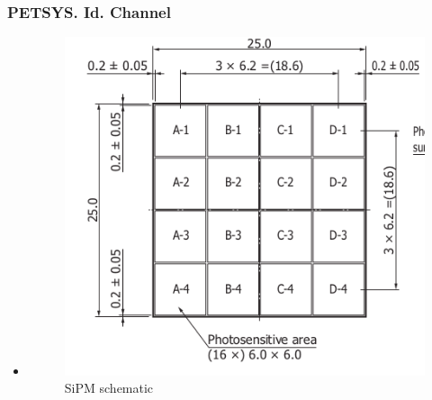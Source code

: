 \documentclass{beamer}
\begin{document}
\begin{frame}
\frametitle{PETSYS. Id. Channel}
\begin{itemize}
\item{}

\begin{figure}[hbtp]
\centering
\includegraphics[scale=0.4]{PETSYS/Id_channel/Our_SIPM_schematic.png}
\caption{SiPM schematic}
\end{figure}

\end{itemize}

\end{frame}
\end{document}
